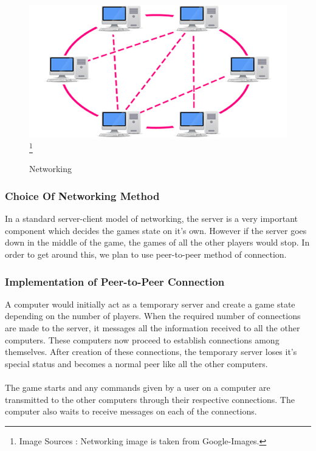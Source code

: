 \documentclass[14 pt]{article}
\begin{document}
\begin{figure}[h!]
\centering
\includegraphics[width =100 mm]{4.jpg}
\footnote{Image Sources : Networking image is taken from Google-Images.}\\
\caption{Networking}
\end{figure}

\subsubsection{Choice Of Networking Method}
    In a standard server-client model of networking, the server is a very important component which decides the games state on it's own. However if the server goes down in the middle of the game, the games of all the other players would stop. In order to get around this, we plan to use peer-to-peer method of connection.\\

\subsubsection{Implementation of Peer-to-Peer Connection}
    A computer would initially act as a temporary server and create a game state depending on the number of players. When the required number of connections are made to the server, it messages all the information received to all the other computers. These computers now proceed to establish connections among themselves. After creation of these connections, the temporary server loses it's special status and becomes a normal peer like all the other computers.\\\\
    The game starts and any commands given by a user on a computer are transmitted to the other computers through their respective connections. The computer also waits to receive messages on each of the connections.\\
\end{document}
